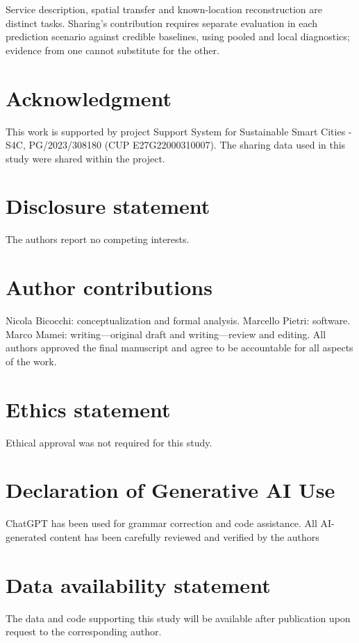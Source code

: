 \documentclass[]{interact}
\begin{document}
Service description, spatial transfer and known-location reconstruction are distinct tasks. Sharing's contribution requires separate evaluation in each prediction scenario against credible baselines, using pooled and local diagnostics; evidence from one cannot substitute for the other.

\section*{Acknowledgment}
This work is supported by project Support System for Sustainable Smart Cities - S4C, PG/2023/308180 (CUP E27G22000310007). The sharing data used in this study were shared within the project.

\section*{Disclosure statement}
The authors report no competing interests.

\section*{Author contributions}
Nicola Bicocchi: conceptualization and formal analysis. Marcello Pietri: software. Marco Mamei: writing---original draft and writing---review and editing. All authors approved the final manuscript and agree to be accountable for all aspects of the work.

\section*{Ethics statement}
Ethical approval was not required for this study.

\section*{Declaration of Generative AI Use}
ChatGPT has been used for grammar correction and code assistance.
All AI-generated content has been carefully reviewed and verified by the authors

\section*{Data availability statement}
The data and code supporting this study will be available after publication upon request to the corresponding author.



\end{document}
